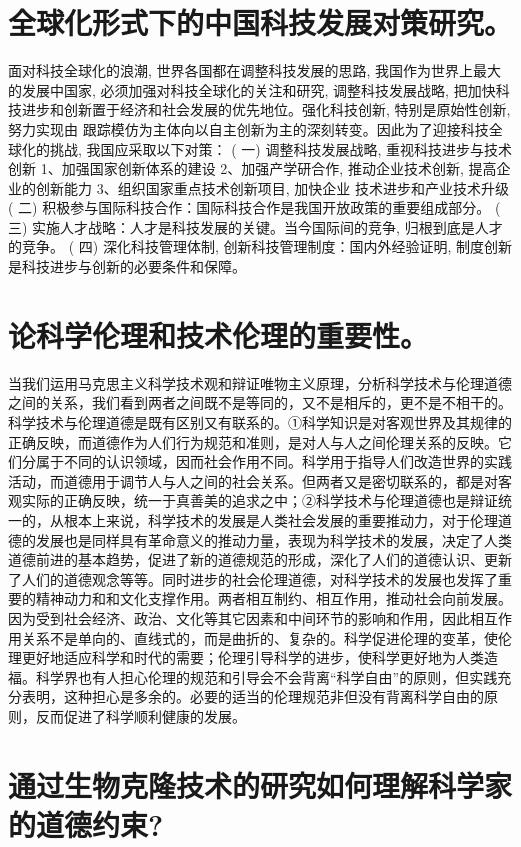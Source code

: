\documentclass[a4paper]{article}
\begin{document}
\section{全球化形式下的中国科技发展对策研究。}

面对科技全球化的浪潮, 世界各国都在调整科技发展的思路, 我国作为世界上最大的发展中国家, 必须加强对科技全球化的关注和研究, 调整科技发展战略, 把加快科技进步和创新置于经济和社会发展的优先地位。强化科技创新, 特别是原始性创新, 努力实现由 跟踪模仿为主体向以自主创新为主的深刻转变。因此为了迎接科技全球化的挑战, 我国应采取以下对策：
( 一) 调整科技发展战略, 重视科技进步与技术创新
1、加强国家创新体系的建设
2、加强产学研合作, 推动企业技术创新, 提高企业的创新能力
3、组织国家重点技术创新项目, 加快企业 技术进步和产业技术升级
( 二) 积极参与国际科技合作：国际科技合作是我国开放政策的重要组成部分。
( 三) 实施人才战略：人才是科技发展的关键。当今国际间的竞争, 归根到底是人才的竞争。
( 四) 深化科技管理体制, 创新科技管理制度：国内外经验证明, 制度创新是科技进步与创新的必要条件和保障。

\section{论科学伦理和技术伦理的重要性。}

当我们运用马克思主义科学技术观和辩证唯物主义原理，分析科学技术与伦理道德之间的关系，我们看到两者之间既不是等同的，又不是相斥的，更不是不相干的。科学技术与伦理道德是既有区别又有联系的。①科学知识是对客观世界及其规律的正确反映，而道德作为人们行为规范和准则，是对人与人之间伦理关系的反映。它们分属于不同的认识领域，因而社会作用不同。科学用于指导人们改造世界的实践活动，而道德用于调节人与人之间的社会关系。但两者又是密切联系的，都是对客观实际的正确反映，统一于真善美的追求之中；②科学技术与伦理道德也是辩证统一的，从根本上来说，科学技术的发展是人类社会发展的重要推动力，对于伦理道德的发展也是同样具有革命意义的推动力量，表现为科学技术的发展，决定了人类道德前进的基本趋势，促进了新的道德规范的形成，深化了人们的道德认识、更新了人们的道德观念等等。同时进步的社会伦理道德，对科学技术的发展也发挥了重要的精神动力和和文化支撑作用。两者相互制约、相互作用，推动社会向前发展。
因为受到社会经济、政治、文化等其它因素和中间环节的影响和作用，因此相互作用关系不是单向的、直线式的，而是曲折的、复杂的。科学促进伦理的变革，使伦理更好地适应科学和时代的需要；伦理引导科学的进步，使科学更好地为人类造福。科学界也有人担心伦理的规范和引导会不会背离“科学自由”的原则，但实践充分表明，这种担心是多余的。必要的适当的伦理规范非但没有背离科学自由的原则，反而促进了科学顺利健康的发展。

\section{通过生物克隆技术的研究如何理解科学家的道德约束?}
\end{document}

